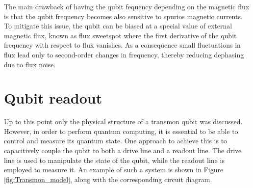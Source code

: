 The main drawback of having the qubit fequency depending on the magnetic flux is that the qubit frequency becomes also sensitive to spurios magnetic currents.
To mitigate this issue, the qubit can be biased at a special value of external magnetic flux, known as flux sweetspot where the first derivative of the qubit frequency with respect to flux vanishes.
As a consequence small fluctuations in flux lead only to second-order changes in frequency, thereby reducing dephasing due to flux noise.

\section{Qubit readout}\label{sec:cQED}
Up to this point only the physical structure of a transmon qubit was discussed. 
However, in order to perform quantum computing, it is essential to be able to control and measure its quantum state.
One approach to achieve this is to capacitively couple the qubit to both a drive line and a readout line. 
The drive line is used to manipulate the state of the qubit, while the readout line is employed to measure it.
An example of such a system is shown in Figure \ref{fig:Transmon_model}, along with the corresponding circuit diagram.

